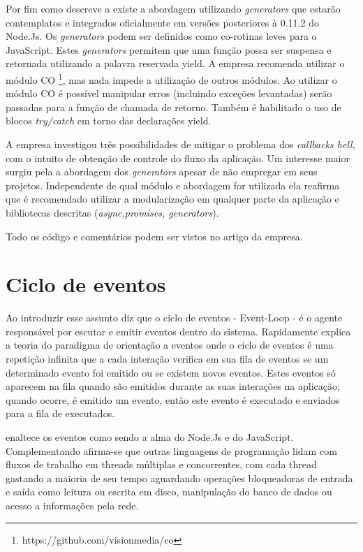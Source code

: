   Por fim como descreve a  existe a abordagem utilizando \textit{generators} que estarão
  contemplatos e integrados oficialmente em versões posteriores à 0.11.2 do Node.Js. Os \textit{generators} podem ser definidos
  como co-rotinas leves para o JavaScript. Estes \textit{generators} permitem que uma função possa ser suspensa e retornada
  utilizando a palavra reservada yield. A empresa recomenda utilizar o módulo CO \footnote{https://github.com/visionmedia/co},
  mas nada impede a utilização de outros módulos. Ao utilizar o módulo CO é possível manipular erros (incluindo exceções levantadas)
  serão passadas para a função de chamada de retorno. Também é habilitado o uso de blocos \textit{try/catch} em torno das 
  declarações yield.
  
  A empresa \cite{Strongloop:2013} investigou três possibilidades de mitigar o problema dos \textit{callbacks hell}, com o 
  intuito de obtenção de controle do fluxo da aplicação. Um interesse maior surgiu pela a abordagem dos \textit{generators}
  apesar de não empregar em seus projetos. Independente de qual módulo e abordagem for utilizada ela reafirma que é recomendado
  utilizar a modularização em qualquer parte da aplicação e bibliotecas descritas (\textit{async,promises, generators}).
  
  Todo os código e comentários podem ser vistos no artigo da empresa. \cite{Strongloop:2013}
  
\section{Ciclo de eventos}
\label{ciclo-de-eventos}
  
  Ao introduzir esse assunto \cite{Pereira:2013} diz que o ciclo de eventos - Event-Loop - 
  é o agente responsável por escutar e emitir eventos dentro do sistema. Rapidamente explica a teoria do paradigma 
  de orientação a eventos onde o ciclo de eventos é uma repetição infinita que a cada interação verifica em sua 
  fila de eventos se um determinado evento foi emitido ou se existem novos eventos. Estes eventos só aparecem na 
  fila quando são emitidos durante as suas interações na aplicação; quando ocorre, é emitido um evento, então este evento 
  é executado e enviados para a fila de executados.
  
  \cite{Wilson:2013} enaltece os eventos como sendo a alma do Node.Js e do JavaScript. 
  Complementando afirma-se que outras linguagens de programação lidam com fluxos de trabalho em threads múltiplas 
  e concorrentes, com cada thread gastando a maioria de seu tempo aguardando operações bloqueadoras de entrada e 
  saída como leitura ou escrita em disco, manipulação do banco de dados ou acesso a informações pela rede.
  
